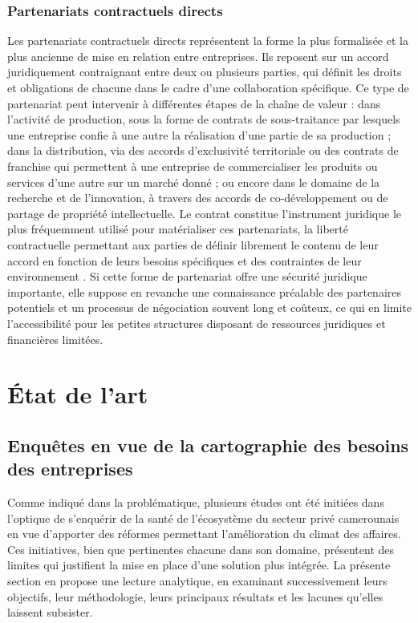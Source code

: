 \documentclass[12pt, a4paper, oneside]{report}
\begin{document}
	\subsubsection{Partenariats contractuels directs}
	Les partenariats contractuels directs représentent la forme la plus formalisée et la plus ancienne de mise en relation entre entreprises. Ils reposent sur un accord juridiquement contraignant entre deux ou plusieurs parties, qui définit les droits et obligations de chacune dans le cadre d'une collaboration spécifique. Ce type de partenariat peut intervenir à différentes étapes de la chaîne de valeur : dans l'activité de production, sous la forme de contrats de sous-traitance par lesquels une entreprise confie à une autre la réalisation d'une partie de sa production ; dans la distribution, via des accords d'exclusivité territoriale ou des contrats de franchise qui permettent à une entreprise de commercialiser les produits ou services d'une autre sur un marché donné ; ou encore dans le domaine de la recherche et de l'innovation, à travers des accords de co-développement ou de partage de propriété intellectuelle. Le contrat constitue l'instrument juridique le plus fréquemment utilisé pour matérialiser ces partenariats, la liberté contractuelle permettant aux parties de définir librement le contenu de leur accord en fonction de leurs besoins spécifiques et des contraintes de leur environnement \cite{williamson1985}. Si cette forme de partenariat offre une sécurité juridique importante, elle suppose en revanche une connaissance préalable des partenaires potentiels et un processus de négociation souvent long et coûteux, ce qui en limite l'accessibilité pour les petites structures disposant de ressources juridiques et financières limitées.
	\section{État de l'art}
	\label{sec:etat_art}
	
	\subsection{Enquêtes en vue de la cartographie des besoins des entreprises}
	Comme indiqué dans la problématique, plusieurs études ont été initiées dans l'optique de s'enquérir de la santé de l'écosystème du secteur privé camerounais en vue d'apporter des réformes permettant l'amélioration du climat des affaires. Ces initiatives, bien que pertinentes chacune dans son domaine, présentent des limites qui justifient la mise en place d'une solution plus intégrée. La présente section en propose une lecture analytique, en examinant successivement leurs objectifs, leur méthodologie, leurs principaux résultats et les lacunes qu'elles laissent subsister.\\
	
\end{document}
